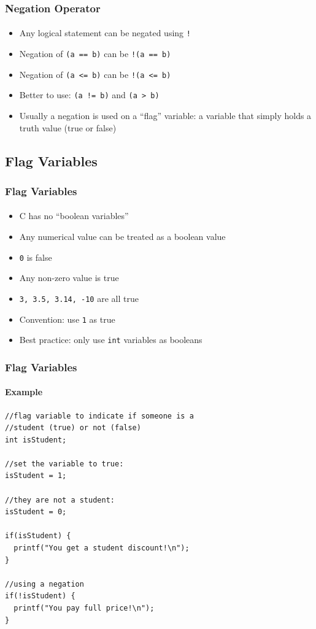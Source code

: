 \documentclass[]{beamer}
\begin{document}
\begin{frame}[fragile]
  \frametitle{Negation Operator}
  \framesubtitle{}

\begin{itemize}[<+->]
  \item Any logical statement can be negated using \texttt{!}
  \item Negation of \texttt{(a == b)} can be \texttt{!(a == b)}
  \item Negation of \texttt{(a <= b)} can be \texttt{!(a <= b)}
  \item Better to use: \texttt{(a != b)} and \texttt{(a > b)}
  \item Usually a negation is used on a ``flag'' variable: a variable that simply holds a truth value (true or false)
\end{itemize}

\end{frame}

\subsection{Flag Variables}

\begin{frame}[fragile]
  \frametitle{Flag Variables}
  \framesubtitle{}

\begin{itemize}[<+->]
  \item C has no ``boolean variables''
  \item Any numerical value can be treated as a boolean value 
  \item \texttt{0} is false
  \item Any non-zero value is true
  \item \texttt{3, 3.5, 3.14, -10} are all true
  \item Convention: use \texttt{1} as true
  \item Best practice: only use \texttt{int} variables as booleans
\end{itemize}

\end{frame}

\begin{frame}[fragile]
  \frametitle{Flag Variables}
  \framesubtitle{Example}
  
\begin{verbatim}
//flag variable to indicate if someone is a 
//student (true) or not (false)
int isStudent;

//set the variable to true:
isStudent = 1;

//they are not a student:
isStudent = 0;

if(isStudent) {
  printf("You get a student discount!\n");
}

//using a negation
if(!isStudent) {
  printf("You pay full price!\n");
}
\end{verbatim}

\end{frame}
\end{document}
